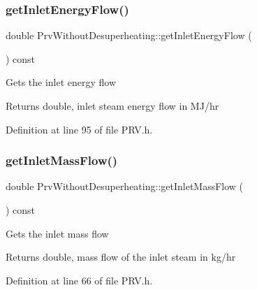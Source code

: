 \subsubsection{\texorpdfstring{get\+Inlet\+Energy\+Flow()}{getInletEnergyFlow()}\hspace{0.1cm}{\footnotesize\ttfamily [3/3]}}
{\footnotesize\ttfamily double Prv\+Without\+Desuperheating\+::get\+Inlet\+Energy\+Flow (\begin{DoxyParamCaption}{ }\end{DoxyParamCaption}) const\hspace{0.3cm}{\ttfamily [inline]}}

Gets the inlet energy flow \begin{DoxyReturn}{Returns}
double, inlet steam energy flow in M\+J/hr 
\end{DoxyReturn}


Definition at line 95 of file P\+R\+V.\+h.

\mbox{\label{class_prv_without_desuperheating_a0ae2ed88cc8bd4e69cddc05ef1225811}} 
\subsubsection{\texorpdfstring{get\+Inlet\+Mass\+Flow()}{getInletMassFlow()}\hspace{0.1cm}{\footnotesize\ttfamily [1/3]}}
{\footnotesize\ttfamily double Prv\+Without\+Desuperheating\+::get\+Inlet\+Mass\+Flow (\begin{DoxyParamCaption}{ }\end{DoxyParamCaption}) const\hspace{0.3cm}{\ttfamily [inline]}}

Gets the inlet mass flow

\begin{DoxyReturn}{Returns}
double, mass flow of the inlet steam in kg/hr 
\end{DoxyReturn}


Definition at line 66 of file P\+R\+V.\+h.

\mbox{\label{class_prv_without_desuperheating_a0ae2ed88cc8bd4e69cddc05ef1225811}} 

